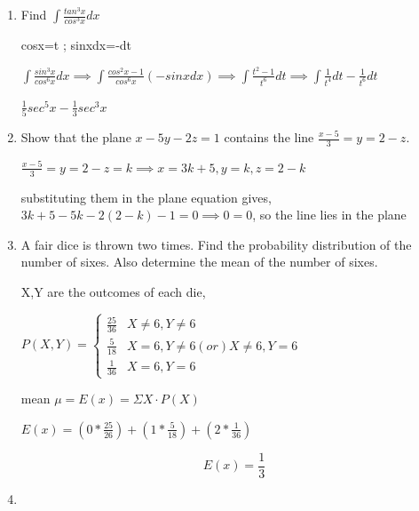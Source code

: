 \begin{enumerate}[label=\thesubsection.\arabic*, ref=\thesubsection.\theenumi]
\textbf{b.} Find $f^\prime(x)$ if $f(x)=(tan~x)^{tan~x}$

\solution

from \eqref{eq:ee26btech11222-prob 21}
\begin{align}
	f^\prime(x)= tanx(tanx)^{tanx -1}(sec^2x) + tanx^{tanx}ln(tanx)sec^2x
\end{align}

$f^\prime(x)= tanx^{tanx}sec^2x\left(1 +ln(tanx)\right)$

\item

Find $\int \frac{tan^3x}{cos^3x}dx$

\solution

cosx=t ; sinxdx=-dt

$\int \frac{sin^3x}{cos^6x}dx  \implies \int \frac{cos^2x-1}{cos^6x}(-sinxdx) \implies \int \frac{t^2-1}{t^6}dt \implies \int \frac{1}{t^4}dt-\frac{1}{t^6}dt$

$\frac{1}{5}sec^5x-\frac{1}{3}sec^3x$

\item 

Show that the plane $x-5y-2z=1$ contains the line $\frac{x-5}{3}=y=2-z.$ 

\solution

$\frac{x-5}{3}=y=2-z=k \implies x=3k+5 ,y=k,z=2-k$

substituting them in the plane equation gives, \newline $3k+5-5k-2(2-k)-1 =0 \implies 0=0 $, so the line lies in the plane 

\item

A fair dice is thrown two times. Find the probability distribution of the number of sixes. Also determine the mean of the number of sixes.

\solution

X,Y are the outcomes of each die,

$P(X,Y)=\begin{cases}
    \frac{25}{36}& X\neq6,Y\neq6 \\ \frac{5}{18}&X=6,Y\neq6 (or )X \neq 6 ,Y=6 \\ \frac{1}{36} & X=6 ,Y=6\end{cases}  $
    
mean $\mu= E(x) =\Sigma X\cdot P(X)$

$E(x)= (0* \frac{25}{26})+(1*\frac{5}{18})+(2*\frac{1}{36})$

$$E(x)=\frac{1}{3}$$

\item 


\end{enumerate}
